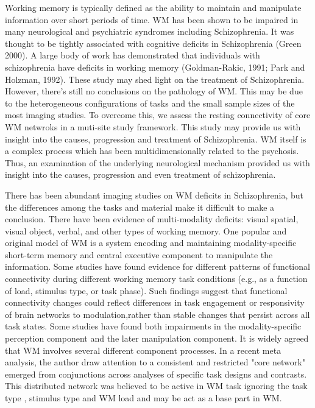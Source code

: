 \documentclass[preprint,authoryear,review,12pt]{elsarticle}
\begin{document}
Working memory is typically defined as the ability to maintain and manipulate information over short periods of time. WM has been shown to be impaired in many neurological and psychiatric syndromes including Schizophrenia. It was thought to be tightly associated with cognitive deficits in Schizophrenia (Green 2000). A large body of work has demonstrated that individuals with schizophrenia have deficits in working memory (Goldman-Rakic, 1991; Park and Holzman, 1992). These study may shed light on the treatment of Schizophrenia. However, there's still no conclusions on the pathology of WM. This may be due to the heterogeneous configurations of tasks and the small sample sizes of the most imaging studies. To overcome this, we assess the resting connectivity of core WM netwroks in a muti-site study framework. This study may provide us with insight into the causes, progression and treatment of Schizophrenia. WM itself is a complex process which has been multidimensionally related to the psychosis. Thus, an examination of the underlying neurological mechanism provided us with insight into the causes, progression and even treatment of schizophrenia. 

There has been abundant imaging studies on WM deficits in Schizophrenia, but the differences among the tasks and material make it difficult to make a conclusion. There have been evidence of multi-modality deficits: visual spatial, visual object, verbal, and other types of working memory. One popular and original model of WM is a system encoding and maintaining modality-specific short-term memory and central executive component to manipulate the information. Some studies have found evidence for different patterns of functional connectivity during different working memory task conditions (e.g., as a function of load, stimulus type, or task phase).  Such findings suggest that functional connectivity changes could reflect differences in task engagement or responsivity of brain networks to modulation,rather than stable changes that persist across all task states. Some studies have found both impairments in the modality-specific perception component and the later manipulation component. It is widely agreed that WM involves several different component processes. In a recent meta analysis, the author draw attention to a consistent and restricted "core network" emerged from conjunctions across analyses of specific task designs and contrasts. This distributed network was believed to be active in WM task ignoring the task type , stimulus type and WM load and may be act as a base part in WM. 
\end{document}
